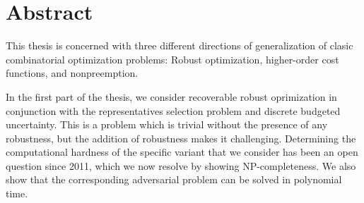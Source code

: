 \documentclass[twoside,openright,bibliography=totoc]{scrreprt}
\begin{document}











\printthesistitle

\printaffidavit



\chapter*{Abstract}
This thesis is concerned with three different directions of generalization of clasic combinatorial optimization problems: Robust optimization, higher-order cost functions, and nonpreemption.

In the first part of the thesis, we consider recoverable robust oprimization in conjunction with the representatives selection problem and discrete budgeted uncertainty. 
This is a problem which is trivial without the presence of any robustness, but the addition of robustness makes it challenging. 
Determining the computational hardness of the specific variant that we consider has been an open question since 2011, which we now resolve by showing NP-completeness. We also show that the corresponding adversarial problem can be solved in polynomial time.
\end{document}
